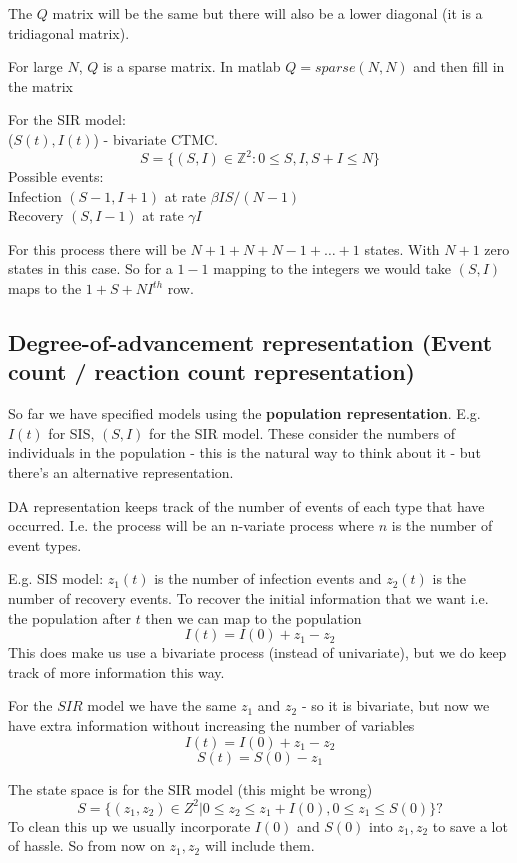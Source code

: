 \documentclass{/home/janmebows/Documents/LatexTemplates/myassignment}
\begin{document}
The $Q$ matrix will be the same but there will also be a lower diagonal (it is a tridiagonal matrix).

For large $N$, $Q$ is a sparse matrix. In matlab $Q = sparse(N,N)$ and then fill in the matrix 



For the SIR model:\\
($S(t),I(t)$) - bivariate CTMC.
\[S = \{(S,I) \in \mathbb{Z}^2 : 0 \leq S,I,S+I\leq N\}\]
Possible events:\\
Infection $(S-1,I+1)$ at rate $\beta IS/(N-1)$\\
Recovery $(S,I-1)$ at rate $\gamma I$

For this process there will be $N+1 +N + N-1 + \hdots + 1$ states. With $N+1$ zero states in this case.
So for a $1-1$ mapping to the integers we would take $(S,I)$ maps to the $1 +S + NI^{th}$ row.


\subsection{Degree-of-advancement representation (Event count / reaction count representation)}
So far we have specified models using the \textbf{population representation}. E.g. $I(t)$ for SIS, $(S,I)$ for the SIR model. These consider the numbers of individuals in the population - this is the natural way to think about it - but there's an alternative representation.

DA representation keeps track of the number of events of each type that have occurred. I.e. the process will be an n-variate process where $n$ is the number of event types.

E.g. SIS model: $z_1(t)$ is the number of infection events and $z_2(t)$ is the number of recovery events. To recover the initial information that we want i.e. the population after $t$ then we can map to the population
\[I(t) = I(0) + z_1 - z_2\]
This does make us use a bivariate process (instead of univariate), but we do keep track of more information this way.

For the $SIR$ model we have the same $z_1$ and $z_2$ - so it is bivariate, but now we have extra information without increasing the number of variables
\[I(t) = I(0) + z_1 - z_2\]
\[S(t) = S(0) - z_1\]

The state space is for the SIR model (this might be wrong)
\[S = \{(z_1,z_2) \in Z^2 | 0 \leq z_2 \leq z_1 + I(0), 0 \leq z_1 \leq S(0)\}?\]
To clean this up we usually incorporate $I(0)$ and $S(0)$ into $z_1,z_2$ to save a lot of hassle.
So from now on $z_1,z_2$ will include them.
\end{document}
